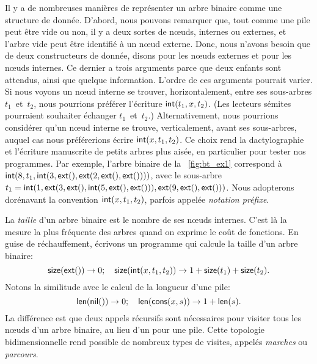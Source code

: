 Il y a de nombreuses manières de représenter un arbre binaire comme
une structure de donnée. D'abord, nous pouvons remarquer que, tout
comme une pile peut être vide ou non, il y a deux sortes de n{\oe}uds,
internes ou externes, et l'arbre vide peut être identifié à un
n{\oe}ud externe. Donc, nous n'avons besoin que de deux constructeurs
de donnée, disons  pour les
n{\oe}uds externes et  pour les
n{\oe}uds internes. Ce dernier a trois arguments parce que deux
enfants sont attendus, ainsi que quelque information. L'ordre de ces
arguments pourrait varier. Si nous voyons un n{\oe}ud interne se
trouver, horizontalement, entre ses sous-arbres \(t_1\)~et~\(t_2\),
nous pourrions préférer l'écriture \(\textsf{int}(t_1,x,t_2)\). (Les
lecteurs sémites pourraient souhaiter échanger \(t_1\)~et~\(t_2\).)
Alternativement, nous pourrions considérer qu'un n{\oe}ud interne se
trouve, verticalement, avant ses sous-arbres, auquel cas nous
préférerions écrire \(\textsf{int}(x,t_1,t_2)\). Ce choix rend la
dactylographie et l'écriture manuscrite de petits arbres plus aisée,
en particulier pour tester nos programmes. Par exemple,
l'arbre binaire de la \fig~\vref{fig:bt_ex1} correspond à
\(\textsf{int}(8, t_1, \textsf{int}(3, \textsf{ext}(), \textsf{ext}(2,
\textsf{ext}(), \textsf{ext}())))\), avec le sous-arbre \(t_1=\textsf{int}(1,
\textsf{ext}(3, \textsf{ext}(), \textsf{int}(5, \textsf{ext}(), \textsf{ext}())),
\textsf{ext}(9, \textsf{ext}(), \textsf{ext}()))\). Nous adopterons dorénavant
la convention \(\textsf{int}(x,t_1,t_2)\), parfois appelée \emph{notation
  préfixe}.

La \emph{taille} d'un arbre binaire est le
nombre de ses n{\oe}uds internes. C'est là la mesure la plus fréquente
des arbres quand on exprime le coût de fonctions. En guise de
réchauffement, écrivons un programme qui calcule la taille d'un arbre
binaire:
\begin{equation}
\fun{size}(\fun{ext}()) \rightarrow 0;\quad
\fun{size}(\fun{int}(x,t_1,t_2))
  \rightarrow 1 + \fun{size}(t_1) + \fun{size}(t_2).
\index{size@\fun{size/1}}
\label{eq_size}
\end{equation}
Notons la similitude avec le calcul de la longueur d'une pile:
\begin{equation*}
\fun{len}(\fun{nil}()) \rightarrow 0;\quad
\fun{len}(\fun{cons}(x,s)) \rightarrow 1 + \fun{len}(s).
\index{len@\fun{len/1}}
\index{nil@\fun{nil/0}}
\index{cons@\fun{cons/2}}
\end{equation*}
La différence est que deux appels récursifs sont nécessaires pour
visiter tous les n{\oe}uds d'un arbre binaire, au lieu d'un pour une
pile. Cette topologie bidimensionnelle rend possible de nombreux types
de visites, appelés \emph{marches} ou \emph{parcours}.

